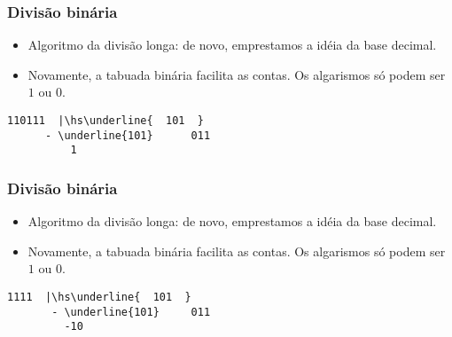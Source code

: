 \documentclass{beamer}
\begin{document}
\begin{frame}[fragile]
\frametitle{Divisão binária}

\begin{itemize}
\item Algoritmo da divisão longa: de novo, emprestamos a idéia da base decimal.

\item Novamente, a tabuada binária facilita as contas. Os algarismos só podem ser $1$ ou $0$.
\end{itemize}

\def\hs{\hspace{-1mm}}

\begin{Verbatim}[commandchars=\\\{\},codes={\catcode`$=3\catcode`^=7}]
        110111  |\hs\underline{  101  }
      - \underline{101}      011
          1  
\end{Verbatim}

\end{frame}


\begin{frame}[fragile]
\frametitle{Divisão binária}

\begin{itemize}
\item Algoritmo da divisão longa: de novo, emprestamos a idéia da base decimal.

\item Novamente, a tabuada binária facilita as contas. Os algarismos só podem ser $1$ ou $0$.
\end{itemize}

\def\hs{\hspace{-1mm}}

\begin{Verbatim}[commandchars=\\\{\},codes={\catcode`$=3\catcode`^=7}]
          1111  |\hs\underline{  101  }
       - \underline{101}     011
         -10  
\end{Verbatim}

\end{frame}

\end{document}
